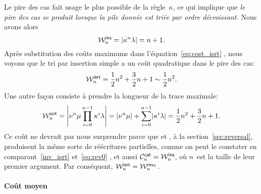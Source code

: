 Le pire des cas fait usage le plus possible de la règle~\(\kappa\), ce
qui implique que \emph{le pire des cas se produit lorsque la pile
  donnée est triée par ordre décroissant.}  Nous avons
alors
\begin{equation*}
\W{\fun{ins}}{n} = \len{\kappa^n\lambda} = n + 1.
\end{equation*}
Après substitution des coûts maximums dans
l'équation~\eqref{eq:cost_isrt} , nous voyons
que le tri par insertion simple a un coût quadratique dans le pire des
cas:
\begin{equation*}
\W{\fun{isrt}}{n} = \frac{1}{2}{n^2} + \frac{3}{2}{n} + 1
\sim \frac{1}{2}{n^2}.
\end{equation*}
Une autre façon consiste à prendre la longueur de la trace maximale:
\begin{equation*}
\W{\fun{isrt}}{n}
 = \left\lvert\nu^n\mu \prod_{i=0}^{n-1}\kappa^i\lambda\right\rvert
 = \len{\nu^n\mu} + \sum_{i=0}^{n-1}\len{\kappa^i\lambda}
 = \frac{1}{2}{n^2} + \frac{3}{2}{n} + 1.
\end{equation*}
Ce coût ne devrait pas nous surprendre parce que
 et
, à la
section~\ref{sec:reversal}, produisent la même sorte de réécritures
partielles, comme on peut le constater en comparant~\eqref{inv_isrt}
 et~\eqref{eq:rev0} , et aussi
\(\C{\fun{cat}}{n} =
\W{\fun{ins}}{n}\),
où \(n\)~est la taille de leur premier argument. Par conséquent,
\(\W{\fun{isrt}}{n} = \W{\fun{rev}_0}{n}\).

\paragraph{Coût moyen}
\label{par:ave_isrt}

